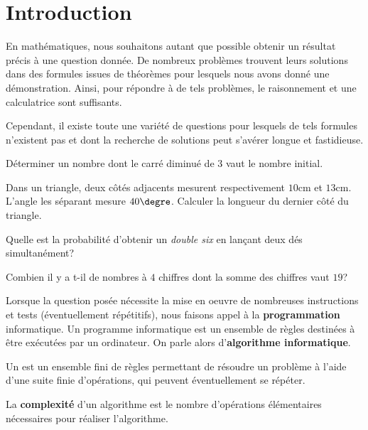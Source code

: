 \section{Introduction}
\label{sec:introduction}
\thispagestyle{fancy}

En mathématiques, nous souhaitons autant que possible obtenir un résultat précis à une question donnée. De nombreux problèmes trouvent leurs solutions dans des formules issues de théorèmes pour lesquels nous avons donné une démonstration. Ainsi, pour répondre à de tels problèmes, le raisonnement et une calculatrice sont suffisants.

\medskip
Cependant, il existe toute une variété de questions pour lesquels de tels formules n'existent pas et dont la recherche de solutions peut s'avérer longue et fastidieuse. 

\begin{boxexstheorieligne}
\exo
Déterminer un nombre dont le carré diminué de 3 vaut le nombre initial.



\eexo



\exo
Dans un triangle, deux côtés adjacents mesurent respectivement $10$\;cm et $13$\;cm. L'angle les séparant mesure $40\degre$. Calculer la longueur du dernier côté du triangle.



\eexo



\exo
Quelle est la probabilité d'obtenir un \textit{double six} en lançant deux dés simultanément?



\eexo



\exo
Combien il y a t-il de nombres à $4$ chiffres dont la somme des chiffres vaut $19$?
\end{boxexstheorieligne}


\bigskip
Lorsque la question posée nécessite la mise en oeuvre de nombreuses instructions et tests (éventuellement répétitifs), nous faisons appel à la \textbf{programmation} informatique. Un programme informatique est un ensemble de règles destinées à être exécutées par un ordinateur. On parle alors d'\textbf{algorithme informatique}.



\begin{definition}
Un  est un ensemble fini de règles permettant de résoudre un problème à l'aide d'une suite finie d'opérations, qui peuvent éventuellement se répéter.

\smallskip
La \textbf{complexité} d'un algorithme est le nombre d'opérations élémentaires nécessaires pour réaliser l'algorithme.
\end{definition}

